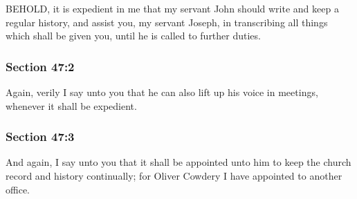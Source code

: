		BEHOLD, it is expedient in me that my servant John should write and keep a regular history, and assist you, my servant Joseph, in transcribing all things which shall be given you, until he is called to further duties.


	\subsubsection{Section 47:2} %
		\label{DC47-2}

		Again, verily I say unto you that he can also lift up his voice in meetings, whenever it shall be expedient.


	\subsubsection{Section 47:3} %
		\label{DC47-3}

		And again, I say unto you that it shall be appointed unto him to keep the church record and history continually; for Oliver Cowdery I have appointed to another office.


